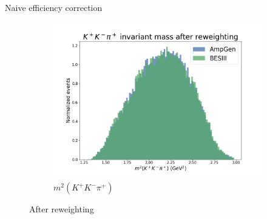 \documentclass{beamer}
\begin{document}
\begin{frame}{Naive efficiency correction}
\begin{figure}
\begin{subfigure}{0.33\textwidth}
      \includegraphics[width = 1.0\textwidth]{Plots/s012_AfterReweighting.png}
      \caption{$m^2(K^+K^-\pi^+)$}
    \end{subfigure}
    \caption{After reweighting}
  \end{figure}
\end{frame}
\end{document}
